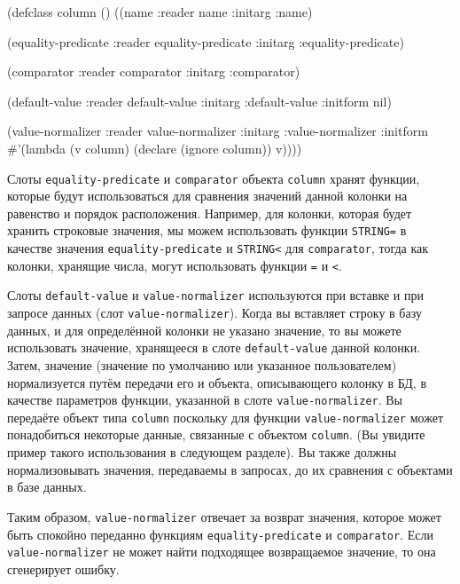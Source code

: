 \begin{myverb}
(defclass column ()
  ((name               
    :reader name
    :initarg :name)

   (equality-predicate
    :reader equality-predicate
    :initarg :equality-predicate)

   (comparator
    :reader comparator
    :initarg :comparator)

   (default-value
    :reader default-value
    :initarg :default-value
    :initform nil)

   (value-normalizer
    :reader value-normalizer
    :initarg :value-normalizer
    :initform #'(lambda (v column) (declare (ignore column)) v))))
\end{myverb}

Слоты \lstinline{equality-predicate} и \lstinline{comparator} объекта \lstinline{column} хранят функции,
которые будут использоваться для сравнения значений данной колонки на равенство и порядок
расположения.  Например, для колонки, которая будет хранить строковые значения, мы можем
использовать функции \lstinline{STRING=} в качестве значения \lstinline{equality-predicate} и
\lstinline{STRING<} для \lstinline{comparator}, тогда как колонки, хранящие числа, могут
использовать функции \lstinline{=} и \lstinline!<!.

Слоты \lstinline{default-value} и \lstinline{value-normalizer} используются при вставке и при
запросе данных (слот \lstinline{value-normalizer}).  Когда вы вставляет строку в базу данных, и
для определённой колонки не указано значение, то вы можете использовать значение,
хранящееся в слоте \lstinline{default-value} данной колонки.  Затем, значение (значение по
умолчанию или указанное пользователем) нормализуется путём передачи его и объекта,
описывающего колонку в БД, в качестве параметров функции, указанной в слоте
\lstinline{value-normalizer}.  Вы передаёте объект типа \lstinline{column} поскольку для функции
\lstinline{value-normalizer} может понадобиться некоторые данные, связанные с объектом
\lstinline{column}. (Вы увидите пример такого использования в следующем разделе).  Вы также
должны нормализовывать значения, передаваемы в запросах, до их сравнения с объектами в
базе данных.

Таким образом, \lstinline{value-normalizer} отвечает за возврат значения, которое может быть
спокойно переданно функциям \lstinline{equality-predicate} и \lstinline{comparator}.  Если
\lstinline{value-normalizer} не может найти подходящее возвращаемое значение, то она
сгенерирует ошибку.

